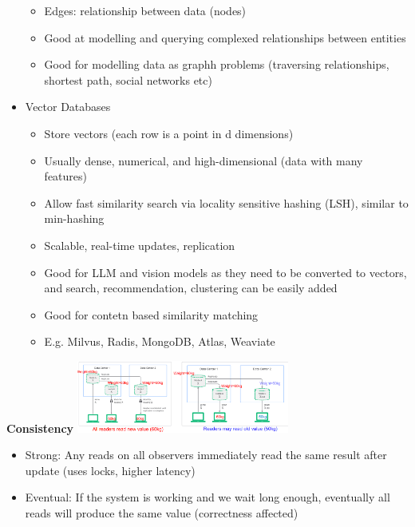 \documentclass[10pt, landscape]{article}
\begin{document}
\begin{multicols}{4}
\begin{itemize}
\begin{itemize}
    \item Edges: relationship between data (nodes)
    \item Good at modelling and querying complexed relationships between entities
    \item Good for modelling data as graphh problems (traversing relationships, shortest path, social networks etc) 
  \end{itemize}
  \item Vector Databases
  \begin{itemize}
    \item Store vectors (each row is a point in d dimensions)
    \item Usually dense, numerical, and high-dimensional (data with many features)
    \item Allow fast similarity search via locality sensitive hashing (LSH), similar to min-hashing
    \item Scalable, real-time updates, replication
    \item Good for LLM and vision models as they need to be converted to vectors, and search, recommendation, clustering can be easily added 
    \item Good for contetn based similarity matching
    \item E.g. Milvus, Radis, MongoDB, Atlas, Weaviate
  \end{itemize}
\end{itemize}

\textbf{Consistency}
\includegraphics*[width=7cm]{consistency}
\begin{itemize}
  \item Strong: Any reads on all observers immediately read the same result after update (uses locks, higher latency)
  \item Eventual: If the system is working and we wait long enough, eventually all reads will produce the same value (correctness affected)
\end{itemize}


\end{multicols}
\end{document}
